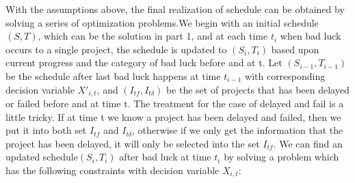 \documentclass[final,3p,times]{elsarticle}
\begin{document}
	With the assumptions above, the final realization of schedule can be obtained by solving a series of optimization problems.We begin with an initial schedule $(S,T)$, which can be the solution in part 1, and at each time $t_i$ when bad luck occurs to a single project, the schedule is updated to $(S_i, T_i)$ based upon current progress and the category of bad luck before and at t. Let $(S_{i-1},T_{i-1})$ be the schedule after last bad luck happens at time $t_{i-1}$ with corresponding decision variable $X'_{i,t}$, and $(I_{tf}, I_{t\delta})$ be the set of projects that has been delayed or failed before and at time t. The treatment for the case of delayed and fail is a little tricky. If at time t we know a project has been delayed and failed, then we put it into both set $I_{tf}$ and $I_{t\delta}$, otherwise if we only get the information that the project has been delayed, it will only be selected into the set $I_{tf}$. We can find an updated schedule$(S_{i},T_{i})$ after bad luck at time $t_i$ by solving a problem which has the following constraints with decision variable $X_{i,t}$:
\end{document}
